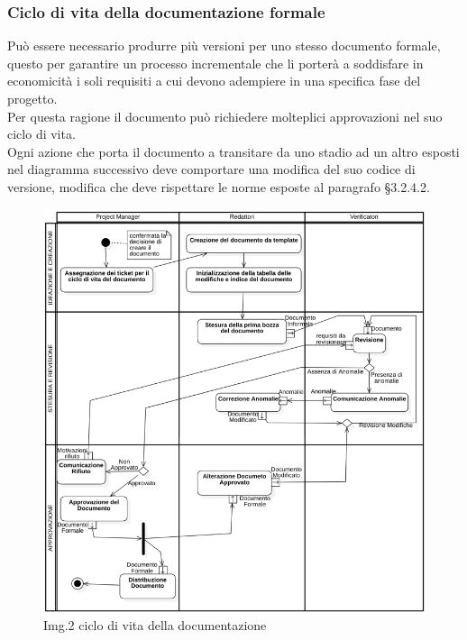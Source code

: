 		\subsubsection{Ciclo di vita della documentazione formale}
			Può essere necessario produrre più versioni per uno stesso documento formale, questo per garantire un processo incrementale che li porterà a soddisfare in economicità i soli requisiti a cui devono adempiere in una specifica fase del progetto.\\
			Per questa ragione il documento può richiedere molteplici approvazioni nel suo ciclo di vita.\\
			Ogni azione che porta il documento a transitare da uno stadio ad un altro esposti nel diagramma successivo deve comportare una modifica del suo codice di versione, modifica che deve rispettare le norme esposte al paragrafo §3.2.4.2.\\
			\begin{figure}[H]
    				\centering
    				\includegraphics[width=1.0\textwidth]{res/images/ciclo_di_vita.png}
				\caption{Img.2 ciclo di vita della documentazione}
				\label{fig:Img.2 ciclo di vita della documentazione}
			\end{figure}

